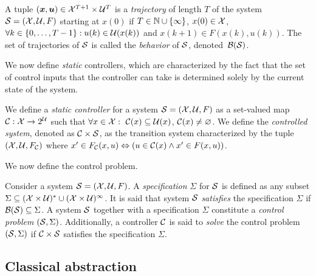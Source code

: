 \documentclass{juliacon}
\begin{document}
\vskip 6pt
A tuple $(\boldsymbol{x}, \boldsymbol{u})\in \mathcal{X}^{T+1}\times \mathcal{U}^{T}$ is a \emph{trajectory} of length $T$ of the system $\mathcal{S}=(\mathcal{X},\mathcal{U}, F)$ starting at $x(0)$ if $T\in\mathbb{N}\cup \{\infty\}$, $x(0)\in\mathcal{X}$, $\forall k\in \{0,\ldots,T-1\}: u(k)\in \mathcal{U}(x(k))$ and $x(k+1) \in F(x(k), u(k))$.
The set of trajectories of $\mathcal{S}$ is called the \emph{behavior} of $\mathcal{S}$, denoted~$\mathcal{B}(\mathcal{S})$.

\vskip 6pt 

We now define \emph{static} controllers, which are characterized by the fact that the set of control inputs that the controller can take is determined solely by the current state of the system.

\begin{defi}\label{def:controller}
 We define a \emph{static controller} for a system $\mathcal{S} = (\mathcal{X},\mathcal{U}, F)$ as a set-valued map $\mathcal{C} :\mathcal{X}\rightarrow 2^{\mathcal{U}}$ such that $\forall x\in\mathcal{X}: \ \mathcal{C}(x) \subseteq \mathcal{U}(x)$, $\mathcal{C}(x) \ne \varnothing$. We define the \emph{controlled system}, denoted as $\mathcal{C}\times \mathcal{S}$, as the transition system characterized by the tuple $(\mathcal{X},\mathcal{U}, F_{\mathcal{C}})$ where
 $x'\in F_{\mathcal{C}}(x, u) \Leftrightarrow (u\in \mathcal{C}(x)\land x'\in F(x,u))$.
\end{defi}

%
We now define the control problem.
\begin{defi}\label{def:specification}
Consider a system $\mathcal{S} = (\mathcal{X},\mathcal{U}, F)$. A \emph{specification} $\Sigma$ for $\mathcal{S}$ is defined as any subset $\Sigma \subseteq (\mathcal{X}\times \mathcal{U})^{*} \cup (\mathcal{X}\times \mathcal{U})^{\infty}$. It is said that system $\mathcal{S}$ \emph{satisfies} the specification $\Sigma$ if $\mathcal{B}(\mathcal{S})\subseteq \Sigma$. 
A system $\mathcal{S}$ together with a specification $\Sigma$ constitute a \emph{control problem} $(\mathcal{S},\Sigma)$.
Additionally, a controller $\mathcal{C}$ is said to \emph{solve} the control problem $(\mathcal{S},\Sigma)$ if $\mathcal{C}\times \mathcal{S}$ satisfies the specification $\Sigma$.
\end{defi}

\subsection{Classical abstraction}
\end{document}
